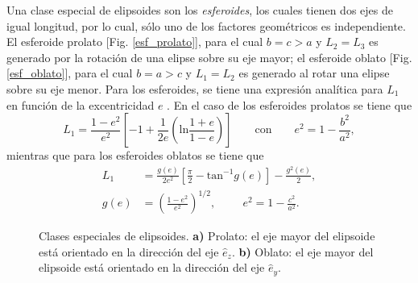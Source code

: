 Una clase especial de elipsoides son los \textit{esferoides}, los cuales tienen dos ejes de igual longitud, por lo cual, sólo uno de los factores geométricos es independiente. El esferoide prolato [Fig. \ref{esf_prolato}], para el cual $b=c>a$ y $L_2=L_3$ es generado por la rotación de una elipse sobre su eje mayor; el esferoide oblato [Fig. \ref{esf_oblato}], para el cual $b=a>c$ y $L_1=L_2$ es generado al rotar una elipse sobre su eje menor. Para los esferoides, se tiene una expresión analítica para $L_1$ en función de la excentricidad $e$ \cite{Bohren}. En el caso de los esferoides prolatos se tiene que
\begin{equation}
	L_1=\frac{1-e^2}{e^2}\left[-1+\frac{1}{2e}\left(\text{ln}\frac{1+e}{1-e}\right)\right]\qquad\text{con}\qquad e^2=1-\frac{b^2}{a^2},
\end{equation}
mientras que para los esferoides oblatos se tiene que
    \begin{align}
        L_1&=\frac{g(e)}{2e^2}\left[\frac{\pi}{2}-\mbox{tan}^{-1}g(e)\right]-\frac{g^2(e)}{2},\\
        g(e)&=\left(\frac{1-e^2}{e^2}\right)^{1/2},\hspace{1cm}e^2=1-\frac{c^2}{a^2}.
    \end{align}


\begin{figure}[h!]
	\quad%
	\caption{Clases especiales de elipsoides. \textbf{a)} Prolato: el eje mayor del elipsoide está orientado en la dirección del eje $\hat{e}_z$. \textbf{b)} Oblato: el eje mayor del elipsoide está orientado en la dirección del eje $\hat{e}_y$.}\label{fig:test}
\end{figure}

